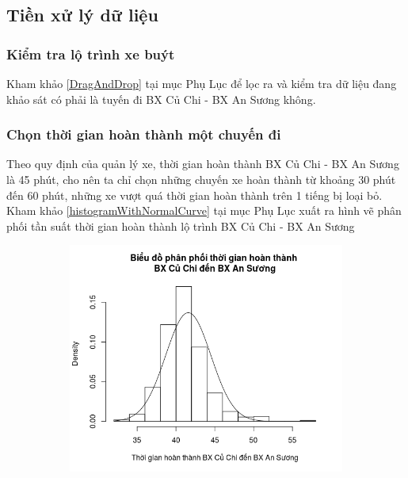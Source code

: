 \documentclass[a4paper, 13pt]{report}
\begin{document}
\subsection{Tiền xử lý dữ liệu} 
\subsubsection{Kiểm tra lộ trình xe buýt}
Kham khảo \ref{DragAndDrop} tại mục Phụ Lục để lọc ra và kiểm tra dữ liệu đang khảo sát có phải là tuyến đi BX Củ Chi - BX An Sương không.\\
\subsubsection{Chọn thời gian hoàn thành một chuyến đi}
Theo quy định của quản lý xe, thời gian hoàn thành BX Củ Chi - BX An Sương là 45 phút, cho nên ta chỉ chọn những chuyến xe hoàn thành từ khoảng 30 phút đến 60 phút, những xe vượt quá thời gian hoàn thành trên 1 tiếng bị loại bỏ.\\ 
Kham khảo \ref{histogramWithNormalCurve} tại mục Phụ Lục xuất ra hình vẽ phân phối tần suất thời gian hoàn thành lộ trình BX Củ Chi - BX An Sương\\
\FloatBarrier
\begin{figure}[h!]
        \begin{subfigure}[b]{0.5\textwidth}
                \label{tab:example}
                \includegraphics[width=\linewidth]{histogramCCAS}
        \end{subfigure}%
\end{figure}
\end{document}
